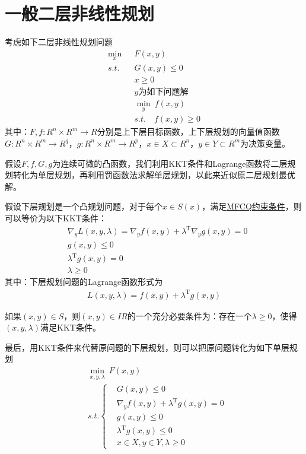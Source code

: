 \section{一般二层非线性规划}
        \par
        考虑如下二层非线性规划问题
        \begin{align*}
            \mathop{\min}\limits_{x}\ & F(x,y)\\
            s.t.\quad & G(x,y)\leqslant 0\\
            &x\geqslant 0\\
            &y\text{为如下问题解}\\
            & \mathop{\min}\limits_{y}\ f(x,y)\\
            &s.t.\quad  f(x,y) \geqslant 0
        \end{align*}
        其中：$F,f:R^n\times R^m\to R$分别是上下层目标函数，上下层规划的向量值函数$G:R^n\times R^m\to R^q$，$g:R^n\times R^m\to R^p$，$x\in X\subset R^n$，$y\in Y\subset R^m$为决策变量。
        \par
        假设$F,f,G,g$为连续可微的凸函数，我们利用KKT条件和Lagrange函数将二层规划转化为单层规划，再利用罚函数法求解单层规划，以此来近似原二层规划最优解。
        \par
        假设下层规划是一个凸规划问题，对于每个$x \in S(x)$，满足\underline{MFCQ约束条件}，则可以等价为以下KKT条件：
            \begin{align*}
            &{\nabla}_yL({x,y,\lambda})= {\nabla}_y f(x,y)+{\lambda}^\mathrm{T} {\nabla}_yg(x,y)=0 \\
            & g(x,y)\leqslant 0 \\
            & {\lambda}^\mathrm{T} g(x,y)=0\\
           & {\lambda} \geqslant 0
            \end{align*}
            其中：下层规划问题的Lagrange函数形式为
            \begin{align*}
            L({x,y,\lambda})= f(x,y)+{\lambda}^\mathrm{T} g(x,y)
            \end{align*}
        \begin{theorem}
        如果$(x,y)\in S$，则$(x,y)\in IR$的一个充分必要条件为：存在一个${\lambda} \geqslant 0$，使得$(x,y,\lambda)$满足KKT条件。
        \par
        最后，用KKT条件来代替原问题的下层规划，则可以把原问题转化为如下单层规划
            \begin{align*}
            &\mathop{\min}\limits_{x,y,\lambda}\  F(x,y)\\
            &s.t.\left\{
            \begin{aligned}
            & G(x,y)\leqslant 0\\
            & {\nabla}_y f(x,y)+{\lambda}^\mathrm{T} g(x,y)=0\\
            & g(x,y)\leqslant 0\\
            & {\lambda}^\mathrm{T} g(x,y) \leqslant 0\\
            & x\in X,y\in Y,{\lambda}\geqslant 0
            \end{aligned}
                \right.
        \end{align*}
        \end{theorem}
